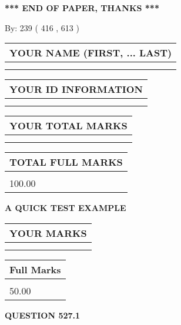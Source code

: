 \documentclass[12pt]{article}
\begin{document}
\vspace{1.0in} 
{\textbf{\large{ *** END OF PAPER, THANKS *** }}} 
   
   
\hspace{1.0in} By: 
 239 ( 416 ,  613 )
   
   
   
   
\newpage 
\setcounter{page}{ 
   527001 } 
   
   
   
   
\noindent\begin{tabular}{|l|}
\hline
YOUR NAME (FIRST, ... LAST)  \\
\hline
 \\ 
 \\ 
\hline
\end{tabular}
\hspace{0.05in} \begin{tabular}{|l|}
\hline
 YOUR   ID   INFORMATION  \\
\hline
 \\ 
 \\ 
\hline
\end{tabular}
   
   
\vspace{0.2in}\noindent\begin{tabular}{|l|}
\hline
YOUR TOTAL MARKS  \\
\hline
 \\ 
 \\ 
\hline
\end{tabular}
\hspace{0.05in} \begin{tabular}{|l|}
\hline
TOTAL FULL MARKS  \\
\hline
 \\ 
100.00 \\
\hline
\end{tabular}
   
   
 \vspace{0.2in}
{\LARGE {\textbf{ A QUICK TEST EXAMPLE}}}
   
   
  
\vspace{0.2in}
  
\noindent\begin{tabular}{|l|}
\hline
 YOUR MARKS  \\
\hline
 \\ 
 \\ 
\hline
\end{tabular}
\hspace{0.05in} \begin{tabular}{|l|}
\hline
 Full Marks  \\
\hline
 \\ 
50.00 \\
\hline
\end{tabular}
{\textbf{\Large{QUESTION
527.1 
}}}
  
\end{document}
